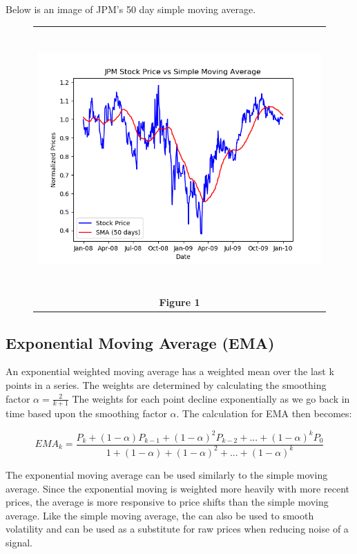 \documentclass[
	letterpaper, %
]{jdf}
\begin{document}
\pagebreak

Below is an image of JPM's 50 day simple moving average.

\begin{figure}[h]
	\begin{tabular}{c}
		\includegraphics[height=10cm]{JPM_sma.png} \\
		\textbf{Figure 1} \\
	\end{tabular}
\end{figure}

\subsection{Exponential Moving Average (EMA)}

An exponential weighted moving average has a weighted mean over the last k points in a series.  The weights are determined by calculating the smoothing factor $ \alpha = \frac{2}{k+1}$ The weights for each point decline exponentially as we go back in time based upon the smoothing factor $ \alpha $.  The calculation for EMA then becomes:

\begin{equation}
EMA_{k} = \frac{P_{k}+(1-\alpha)P_{k-1}+(1-\alpha)^{2}P_{k-2}+...+(1-\alpha)^{k}P_{0}}{1+(1-\alpha)+(1-\alpha)^{2}+...+(1-\alpha)^{k}}  
\end{equation}

The exponential moving average can be used similarly to the simple moving average.  Since the exponential moving is weighted more heavily with more recent prices, the average is more responsive to price shifts than the simple moving average. Like the simple moving average, the can also be used to smooth volatility and can be used as a substitute for raw prices when reducing noise of a signal.
\end{document}
